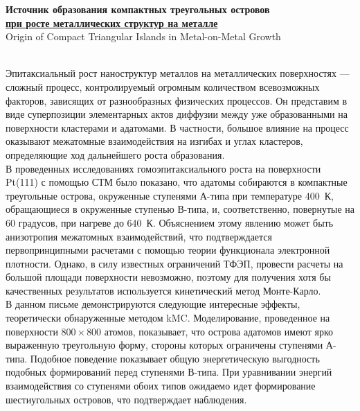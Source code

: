 \documentclass[12pt]{article}
\begin{document}
\pagestyle{fancy}

\begin{raggedright}
    \Large{\textbf{Источник образования компактных треугольных островов}}\\
    \Large\underline{\textbf{при росте металлических структур на металле}}\\
    \scriptsize{Origin of Compact Triangular Islands in Metal-on-Metal Growth}
\end{raggedright}
\\

Эпитаксиальный рост наноструктур металлов на металлических поверхностях --- сложный процесс, контролируемый огромным количеством всевозможных факторов, зависящих от разнообразных физических процессов. Он представим в виде суперпозиции элементарных актов диффузии между уже образованными на поверхности кластерами и адатомами. В частности, большое влияние на процесс оказывают межатомные взаимодействия на изгибах и углах кластеров, определяющие ход дальнейшего роста образования. \\

В проведенных исследованиях гомоэпитаксиального роста на поверхности Pt(111) с помощью СТМ было показано, что адатомы собираются в компактные треугольные острова, окруженные ступенями А-типа при температуре 400~К, обращающиеся в окруженные ступенью В-типа, и, соответственно, повернутые на 60 градусов, при нагреве до 640~К. Объяснением этому явлению может быть анизотропия межатомных взаимодействий, что подтверждается первопринципными расчетами с помощью теории функционала электронной плотности. Однако, в силу известных ограничений ТФЭП, провести расчеты на большой площади поверхности невозможно, поэтому для получения хотя бы качественных результатов используется кинетический метод Монте-Карло. \\

В данном письме демонстрируются следующие интересные эффекты, теоретически обнаруженные методом kMC. Моделирование, проведенное на поверхности $800\times 800$ атомов, показывает, что острова адатомов имеют ярко выраженную треугольную форму, стороны которых ограничены ступенями А-типа. Подобное поведение показывает общую энергетическую выгодность подобных формирований перед ступенями В-типа. При уравнивании энергий взаимодействия со ступенями обоих типов ожидаемо идет формирование шестиугольных островов, что подтверждает наблюдения. \\
\end{document}
